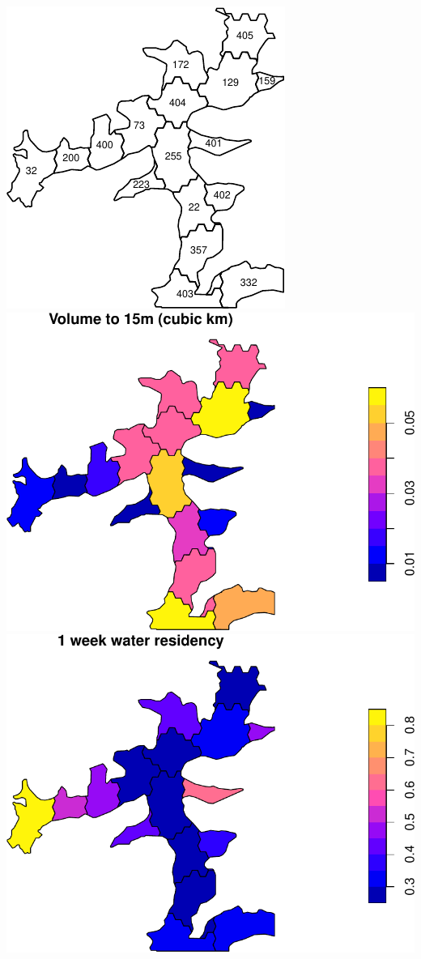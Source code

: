 \documentclass[
]{article}
\begin{document}
\includegraphics{habmodel_files/figure-latex/unnamed-chunk-3-1.pdf}
\includegraphics{habmodel_files/figure-latex/unnamed-chunk-3-2.pdf}
\includegraphics{habmodel_files/figure-latex/unnamed-chunk-3-3.pdf}
\end{document}
